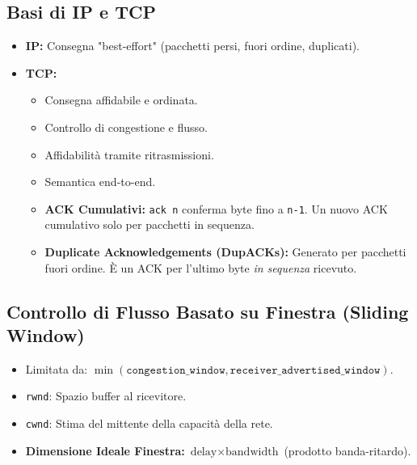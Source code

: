 \subsection{Basi di IP e TCP}
\begin{itemize}
    \item \textbf{IP:} Consegna "best-effort" (pacchetti persi, fuori ordine, duplicati).
    \item \textbf{TCP:}
    \begin{itemize}
        \item Consegna affidabile e ordinata.
        \item Controllo di congestione e flusso.
        \item Affidabilità tramite ritrasmissioni.
        \item Semantica end-to-end.
        \item \textbf{ACK Cumulativi:} \texttt{ack n} conferma byte fino a \texttt{n-1}. Un nuovo ACK cumulativo solo per pacchetti in sequenza.
        \item \textbf{Duplicate Acknowledgements (DupACKs):} Generato per pacchetti fuori ordine. È un ACK per l'ultimo byte \textit{in sequenza} ricevuto.
    \end{itemize}
\end{itemize}

\subsection{Controllo di Flusso Basato su Finestra (Sliding Window)}
\begin{itemize}
    \item Limitata da: $\min(\texttt{congestion\_window}, \texttt{receiver\_advertised\_window})$.
    \item \texttt{rwnd}: Spazio buffer al ricevitore.
    \item \texttt{cwnd}: Stima del mittente della capacità della rete.
    \item \textbf{Dimensione Ideale Finestra:} $\text{delay} \times \text{bandwidth}$ (prodotto banda-ritardo).
\end{itemize}

